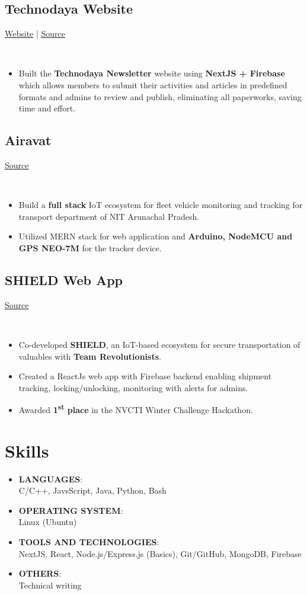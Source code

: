 \documentclass[]{article}
\newcommand{\subheading}[2]{
  {\subsection{#1}
  \hfill{#2}}\\
  \vspace{2pt}
}
\newenvironment{tightemize}{
\vspace{-4pt}
\begin{itemize}
  \itemsep3pt \parskip0pt \parsep0pt}
{\end{itemize}\vspace{-\topsep}}
\begin{document}
\begin{multicols}{2}
\begin{flushleft}
    \subheading{Technodaya Website}{
      \href{https://technodaya.vercel.app}{Website} | 
      \href{https://github.com/tripathics/technodaya}{Source}
    }
    \begin{tightemize}
      \item Built the \textbf{Technodaya Newsletter} website using \textbf{NextJS + Firebase} which allows members to submit their activities and articles in predefined formats and admins to review and publish, eliminating all paperworks, saving time and effort.
    \end{tightemize}

    \subheading{Airavat}{\href{https://github.com/tripathics/airavat}{Source}}
    \begin{tightemize}
      \item Build a \textbf{full stack} IoT ecosystem for fleet vehicle monitoring and tracking for transport department of NIT Arunachal Pradesh.
      \item Utilized MERN stack for web application and \textbf{Arduino, NodeMCU and GPS NEO-7M } for the tracker device.
    \end{tightemize}

    \subheading{SHIELD Web App}{\href{https://github.com/tripathics}{Source}}
    \begin{tightemize}
      \item Co-developed \textbf{SHIELD}, an IoT-based ecosystem for secure transportation of valuables with \textbf{Team Revolutionists}. 
      \item Created a ReactJs web app with Firebase backend enabling shipment tracking, locking/unlocking, monitoring with alerts for admins.
      \item Awarded \textbf{1\textsuperscript{st} place} in the NVCTI Winter Challenge Hackathon.
    \end{tightemize}

    \columnbreak

    
    \section{Skills}

    \begin{tightemize}
      \item \textbf{LANGUAGES}:\\
      C/C++, JavsScript, Java, Python, Bash
      \item \textbf{OPERATING SYSTEM}:\\
      Linux (Ubuntu)
      \item \textbf{TOOLS AND TECHNOLOGIES}:\\ 
      NextJS, React, Node.js/Express.js (Basics), Git/GitHub, MongoDB, Firebase
      \item \textbf{OTHERS}:\\      
      Technical writing
    \end{tightemize}


\end{flushleft}
\end{multicols}
\end{document}
